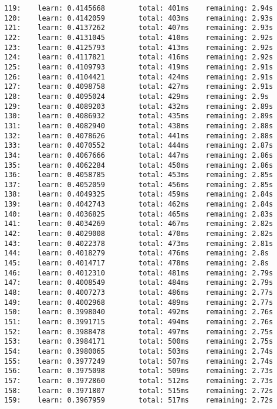 \documentclass[11pt]{article}
\begin{document}
\begin{Verbatim}[commandchars=\\\{\}]
119:    learn: 0.4145668        total: 401ms    remaining: 2.94s
120:    learn: 0.4142059        total: 403ms    remaining: 2.93s
121:    learn: 0.4137262        total: 407ms    remaining: 2.93s
122:    learn: 0.4131045        total: 410ms    remaining: 2.92s
123:    learn: 0.4125793        total: 413ms    remaining: 2.92s
124:    learn: 0.4117821        total: 416ms    remaining: 2.92s
125:    learn: 0.4109793        total: 419ms    remaining: 2.91s
126:    learn: 0.4104421        total: 424ms    remaining: 2.91s
127:    learn: 0.4098758        total: 427ms    remaining: 2.91s
128:    learn: 0.4095024        total: 429ms    remaining: 2.9s
129:    learn: 0.4089203        total: 432ms    remaining: 2.89s
130:    learn: 0.4086932        total: 435ms    remaining: 2.89s
131:    learn: 0.4082940        total: 438ms    remaining: 2.88s
132:    learn: 0.4078626        total: 441ms    remaining: 2.88s
133:    learn: 0.4070552        total: 444ms    remaining: 2.87s
134:    learn: 0.4067666        total: 447ms    remaining: 2.86s
135:    learn: 0.4062284        total: 450ms    remaining: 2.86s
136:    learn: 0.4058785        total: 453ms    remaining: 2.85s
137:    learn: 0.4052059        total: 456ms    remaining: 2.85s
138:    learn: 0.4049325        total: 459ms    remaining: 2.84s
139:    learn: 0.4042743        total: 462ms    remaining: 2.84s
140:    learn: 0.4036825        total: 465ms    remaining: 2.83s
141:    learn: 0.4034269        total: 467ms    remaining: 2.82s
142:    learn: 0.4029008        total: 470ms    remaining: 2.82s
143:    learn: 0.4022378        total: 473ms    remaining: 2.81s
144:    learn: 0.4018279        total: 476ms    remaining: 2.8s
145:    learn: 0.4014717        total: 478ms    remaining: 2.8s
146:    learn: 0.4012310        total: 481ms    remaining: 2.79s
147:    learn: 0.4008549        total: 484ms    remaining: 2.79s
148:    learn: 0.4007273        total: 486ms    remaining: 2.77s
149:    learn: 0.4002968        total: 489ms    remaining: 2.77s
150:    learn: 0.3998040        total: 492ms    remaining: 2.76s
151:    learn: 0.3991715        total: 494ms    remaining: 2.76s
152:    learn: 0.3988478        total: 497ms    remaining: 2.75s
153:    learn: 0.3984171        total: 500ms    remaining: 2.75s
154:    learn: 0.3980065        total: 503ms    remaining: 2.74s
155:    learn: 0.3977249        total: 507ms    remaining: 2.74s
156:    learn: 0.3975098        total: 509ms    remaining: 2.73s
157:    learn: 0.3972860        total: 512ms    remaining: 2.73s
158:    learn: 0.3971807        total: 515ms    remaining: 2.72s
159:    learn: 0.3967959        total: 517ms    remaining: 2.72s

\end{Verbatim}
\end{document}
